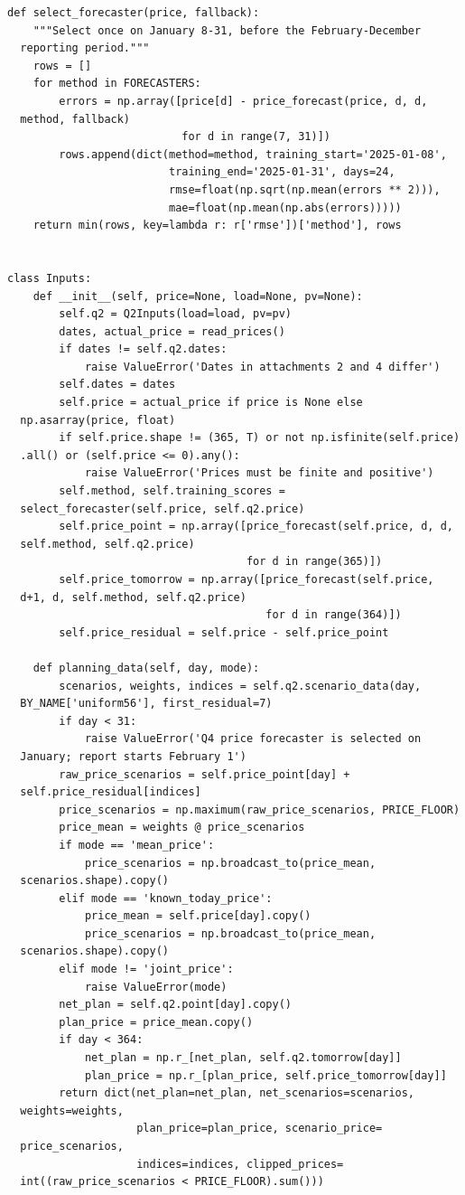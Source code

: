 \begin{verbatim}
def select_forecaster(price, fallback):
    """Select once on January 8-31, before the February-December
  reporting period."""
    rows = []
    for method in FORECASTERS:
        errors = np.array([price[d] - price_forecast(price, d, d,
  method, fallback)
                           for d in range(7, 31)])
        rows.append(dict(method=method, training_start='2025-01-08',
                         training_end='2025-01-31', days=24,
                         rmse=float(np.sqrt(np.mean(errors ** 2))),
                         mae=float(np.mean(np.abs(errors)))))
    return min(rows, key=lambda r: r['rmse'])['method'], rows


class Inputs:
    def __init__(self, price=None, load=None, pv=None):
        self.q2 = Q2Inputs(load=load, pv=pv)
        dates, actual_price = read_prices()
        if dates != self.q2.dates:
            raise ValueError('Dates in attachments 2 and 4 differ')
        self.dates = dates
        self.price = actual_price if price is None else
  np.asarray(price, float)
        if self.price.shape != (365, T) or not np.isfinite(self.price)
  .all() or (self.price <= 0).any():
            raise ValueError('Prices must be finite and positive')
        self.method, self.training_scores =
  select_forecaster(self.price, self.q2.price)
        self.price_point = np.array([price_forecast(self.price, d, d,
  self.method, self.q2.price)
                                     for d in range(365)])
        self.price_tomorrow = np.array([price_forecast(self.price,
  d+1, d, self.method, self.q2.price)
                                        for d in range(364)])
        self.price_residual = self.price - self.price_point

    def planning_data(self, day, mode):
        scenarios, weights, indices = self.q2.scenario_data(day,
  BY_NAME['uniform56'], first_residual=7)
        if day < 31:
            raise ValueError('Q4 price forecaster is selected on
  January; report starts February 1')
        raw_price_scenarios = self.price_point[day] +
  self.price_residual[indices]
        price_scenarios = np.maximum(raw_price_scenarios, PRICE_FLOOR)
        price_mean = weights @ price_scenarios
        if mode == 'mean_price':
            price_scenarios = np.broadcast_to(price_mean,
  scenarios.shape).copy()
        elif mode == 'known_today_price':
            price_mean = self.price[day].copy()
            price_scenarios = np.broadcast_to(price_mean,
  scenarios.shape).copy()
        elif mode != 'joint_price':
            raise ValueError(mode)
        net_plan = self.q2.point[day].copy()
        plan_price = price_mean.copy()
        if day < 364:
            net_plan = np.r_[net_plan, self.q2.tomorrow[day]]
            plan_price = np.r_[plan_price, self.price_tomorrow[day]]
        return dict(net_plan=net_plan, net_scenarios=scenarios,
  weights=weights,
                    plan_price=plan_price, scenario_price=
  price_scenarios,
                    indices=indices, clipped_prices=
  int((raw_price_scenarios < PRICE_FLOOR).sum()))


\end{verbatim}
